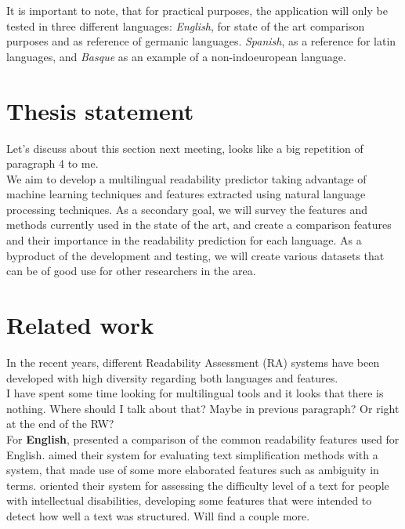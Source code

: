 \documentclass[12pt]{article}
\begin{document}
It is important to note, that for practical purposes, the application will only be tested in three different languages: \textit{English}, for state of the art comparison purposes and as reference of germanic languages. \textit{Spanish}, as a reference for latin languages, and \textit{Basque} as an example of a non-indoeuropean language.



\section{Thesis statement}
{\color{red}Let's discuss about this section next meeting, looks like a big repetition of paragraph 4 to me.}\\

 We aim to develop a multilingual readability predictor taking advantage of machine learning techniques and features extracted using natural language processing techniques. As a secondary goal, we will survey the features and methods currently used in the state of the art, and create a comparison features and their importance in the readability prediction for each language. As a byproduct of the development and testing, we will create various datasets that can be of good use for other researchers in the area.


\section{Related work}
In the recent years, different Readability Assessment (RA) systems have been developed with high diversity regarding both languages and features. \\

{\color{red} I have spent some time looking for multilingual tools and it looks that there is nothing. Where should I talk about that?  Maybe in previous paragraph? Or right at the end of the RW? } \\



For \textbf{English}, \cite{feng2010comparison} presented a comparison of the common readability features used for English. \cite{aluisio2010readability} aimed their system for evaluating text simplification methods with a system, that made use of some more elaborated features such as ambiguity in terms. \cite{feng2009automatic} oriented their system for assessing the difficulty level of a text for people with intellectual disabilities, developing some features that were intended to detect how well a text was structured. {\color{red} Will find a couple more.} \\  
\end{document}
